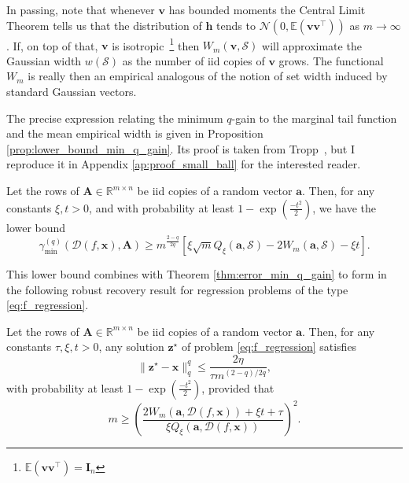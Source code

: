 In passing, note that whenever $\mathbf{v}$ has bounded moments the Central Limit Theorem tells us that the distribution of $\mathbf{h}$ tends to $\mathcal{N}(0, \mathbb{E} \left ( \mathbf{v}\mathbf{v}^\top \right ))$ as $m \to \infty$. If, on top of that, $\mathbf{v}$ is isotropic~\footnote{$\mathbb{E} \left ( \mathbf{v}\mathbf{v}^\top \right )= \mathbf{I}_n$} then $W_{m}(\mathbf{v}, \mathcal{S})$ will approximate the Gaussian width $w(\mathcal{S})$ as the number of \acrshort{iid} copies of $\mathbf{v}$ grows. The functional $W_{m}$ is really then an empirical  analogous of the notion of set width induced by standard Gaussian vectors.

The precise expression relating the minimum $q$-gain to the marginal tail function and the mean empirical width is given in Proposition \ref{prop:lower_bound_min_q_gain}. Its proof is taken from Tropp~\cite{tropp2015a}, but I reproduce it in Appendix \ref{ap:proof_small_ball} for the interested reader.

\begin{proposition}\label{prop:lower_bound_min_q_gain}
    Let the rows of $\mathbf{A} \in \mathbb{R}^{m \times n}$ be \acrshort{iid} copies of a random vector $\mathbf{a}$. Then, for any constants $\xi, t > 0$, and with probability at least $1 - \exp \left ( \frac{-t^2}{2} \right )$, we have the lower bound
    \begin{equation}
        \gamma_{\min}^{(q)} \left ( \mathcal{D}( f, \mathbf{x}), \mathbf{A} \right ) \geq m^{\frac{2 - q}{2q}} \left [ \xi \sqrt{m} Q_{\xi}(\mathbf{a}, \mathcal{S}) - 2 W_{m}(\mathbf{a}, \mathcal{S}) - \xi t \right ].
    \end{equation}
\end{proposition}

This lower bound combines with Theorem \ref{thm:error_min_q_gain} to form in the following robust recovery result for regression problems of the type \eqref{eq:f_regression}.

\begin{corollary}\label{cor:sample_complexity_small_ball_method}
    Let the rows of $\mathbf{A} \in \mathbb{R}^{m \times n}$ be \acrshort{iid} copies of a random vector $\mathbf{a}$. Then, for any constants $\tau, \xi, t > 0$, any solution $\mathbf{z}^\star$ of problem \eqref{eq:f_regression} satisfies
    \begin{equation}
        \| \mathbf{z}^\star - \mathbf{x}\|_q^q \leq \frac{2 \eta}{\tau m^{(2 - q)/2q}},
    \end{equation}
    with probability at least $1 - \exp \left ( \frac{-t^2}{2} \right )$, provided that
    \begin{equation}
        m \geq \left ( \frac{2 W_{m}(\mathbf{a}, \mathcal{D}( f, \mathbf{x})) + \xi t + \tau}{\xi Q_{\xi}(\mathbf{a}, \mathcal{D}( f, \mathbf{x}))} \right )^2.
        \label{eq:sample_complexity_small_ball_method}
    \end{equation}
\end{corollary}

